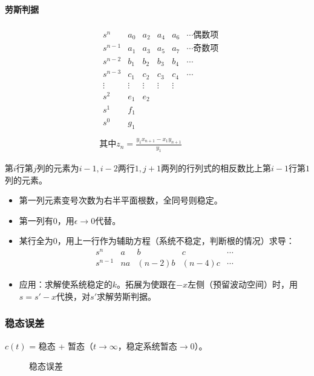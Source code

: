 \documentclass[
12pt, %
a4paper, 
oneside, %
headinclude,footinclude, %
]{scrartcl}
\begin{document}
\paragraph{劳斯判据}
\begin{align*}
&\begin{array}{cccccc}
s^n & a_0 & a_2 & a_4 & a_6 & \cdots \text{偶数项} \\
s^{n - 1} & a_1 & a_3 & a_5 & a_7 & \cdots \text{奇数项} \\
s^{n - 2} & b_1 & b_2 & b_3 & b_4 & \cdots \\
s^{n - 3} & c_1 & c_2 & c_3 & c_4 & \cdots \\
\vdots & \vdots & \vdots & \vdots & \vdots & \\
s^2 & e_1 & e_2 \\
s^1 & f_1 \\
s^0 & g_1 \\
\end{array} \\
& \text{其中} z_n = \frac{y_1 x_{n + 1} - x_1 y_{n + 1}}{y_1}
\end{align*}

第$ i $行第$ j $列的元素为$ i - 1, i - 2 $两行$ 1, j + 1 $两列的行列式的相反数比上第$ i - 1 $行第$ 1 $列的元素。
\begin{itemize}
\item 第一列元素变号次数为右半平面根数，全同号则稳定。
\item 第一列有$ 0 $，用$ \epsilon \to 0 $代替。
\item 某行全为$ 0 $，用上一行作为辅助方程（系统不稳定，判断根的情况）求导：
$$ \begin{array}{ccccc} s^n & a & b & c & \cdots \\ s^{n - 1} & na & (n - 2)b & (n - 4)c & \cdots \end{array} $$
\item 应用：求解使系统稳定的$ k $。拓展为使跟在$ -x $左侧（预留波动空间）时，用$ s = s' - x $代换，对$ s' $求解劳斯判据。
\end{itemize}
\subsubsection[稳态误差]{稳态误差}
$ c(t) $ = 稳态 + 暂态（$ t \to \infty $，稳定系统暂态$ \to 0 $）。
\begin{figure}[H]
\centering 
{}
\caption{稳态误差}
\end{figure}
\end{document}
